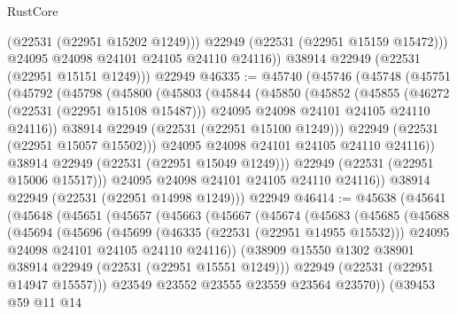 \begin{lexlean}{RustCore}
\begin{coremodule}
              (@22531 (@22951 @15202 @1249)))
            @22949
            (@22531 (@22951 @15159 @15472)))
          @24095
          @24098
          @24101
          @24105
          @24110
          @24116))
      @38914
      @22949
      (@22531 (@22951 @15151 @1249)))
    @22949
@46335 := @45740
    (@45746
      (@45748
        (@45751
          (@45792
            (@45798
              (@45800
                (@45803
                  (@45844
                    (@45850
                      (@45852
                        (@45855
                          (@46272 (@22531 (@22951 @15108 @15487)))
                          @24095
                          @24098
                          @24101
                          @24105
                          @24110
                          @24116))
                      @38914
                      @22949
                      (@22531 (@22951 @15100 @1249)))
                    @22949
                    (@22531 (@22951 @15057 @15502)))
                  @24095
                  @24098
                  @24101
                  @24105
                  @24110
                  @24116))
              @38914
              @22949
              (@22531 (@22951 @15049 @1249)))
            @22949
            (@22531 (@22951 @15006 @15517)))
          @24095
          @24098
          @24101
          @24105
          @24110
          @24116))
      @38914
      @22949
      (@22531 (@22951 @14998 @1249)))
    @22949
@46414 := @45638
    (@45641
      (@45648
        (@45651
          (@45657
            (@45663
              (@45667
                (@45674
                  (@45683
                    (@45685
                      (@45688
                        (@45694
                          (@45696
                            (@45699
                              (@46335 (@22531 (@22951 @14955 @15532)))
                              @24095
                              @24098
                              @24101
                              @24105
                              @24110
                              @24116))
                          (@38909 @15550 @1302 @38901 @38914 @22949 (@22531 (@22951 @15551 @1249)))
                          @22949
                          (@22531 (@22951 @14947 @15557)))
                        @23549
                        @23552
                        @23555
                        @23559
                        @23564
                        @23570))
                    (@39453
                      @59
                      @11
                      @14

\end{coremodule}
\end{lexlean}
